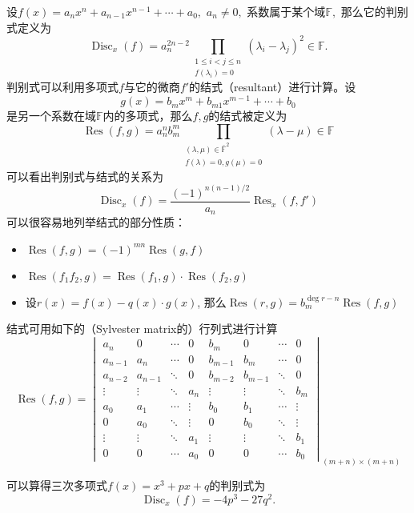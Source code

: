 设$f(x) = a_{n}x^{n} + a_{n-1}x^{n-1} + \cdots + a_{0},$ $a_n \neq 0,$ 系数属于某个域$\mathbb{F},$ 那么它的判别式定义为
$$\operatorname{Disc}_x(f) = a_n^{2n-2} \prod_{\substack{1 \leqslant i < j \leqslant n \\ f(\lambda_i) = 0}} (\lambda_i - \lambda_j)^2 \in \mathbb{F}.$$
判别式可以利用多项式$f$与它的微商$f'$的结式（resultant）进行计算。设
$$
g(x) = b_{m}x^{m} + b_{m1}x^{m-1} + \cdots + b_{0}
$$
是另一个系数在域$\mathbb{F}$内的多项式，那么$f, g$的结式被定义为
$$
\operatorname{Res} (f, g) = a_n^n b_m^m \prod_{ \substack{(\lambda, \mu) \in \bar{\mathbb{F}}^2 \\ f(\lambda) = 0, g(\mu) = 0}} (\lambda - \mu) \in \mathbb{F}
$$
可以看出判别式与结式的关系为
$$
\operatorname{Disc}_{x}(f) = \frac{(-1)^{n(n-1)/2}}{a_{n}} \operatorname{Res}_{x}(f, f')
$$
可以很容易地列举结式的部分性质：
\begin{itemize}
\item $\operatorname{Res} (f, g) = (-1)^{mn} \operatorname{Res} (g, f)$
\item $\operatorname{Res} (f_1f_2, g) = \operatorname{Res} (f_1, g) \cdot \operatorname{Res} (f_2, g)$
\item 设$r(x) = f(x) - q(x) \cdot g(x)$, 那么$\operatorname{Res} (r, g) = b_m^{\deg r - n}\operatorname{Res} (f, g)$
\end{itemize}
结式可用如下的（Sylvester matrix的）行列式进行计算
$$
\operatorname{Res} (f, g) = \begin{vmatrix} a_{n} & 0 & \cdots & 0 & b_{m} & 0 & \cdots & 0 \\ a_{n-1} & a_{n} & \cdots & 0 & b_{m-1} & b_{m} & \cdots & 0 \\ a_{n-2} & a_{n-1} & \ddots & 0 & b_{m-2} & b_{m-1} & \ddots & 0 \\ \vdots & \vdots & \ddots & a_{n} & \vdots & \vdots & \ddots & b_{m} \\ a_{0} & a_{1} & \cdots & \vdots & b_{0} & b_{1} & \cdots & \vdots \\ 0 & a_{0} & \ddots & \vdots & 0 & b_{0} & \ddots & \vdots \\ \vdots & \vdots & \ddots & a_{1} & \vdots & \vdots & \ddots & b_{1} \\ 0 & 0 & \cdots & a_{0} & 0 & 0 & \cdots & b_{0}\end{vmatrix}_{(m+n) \times (m+n)}
$$

可以算得三次多项式$f(x) = x^3 + px + q$的判别式为
$$\operatorname{Disc}_x(f) = -4p^3 - 27q^2.$$

